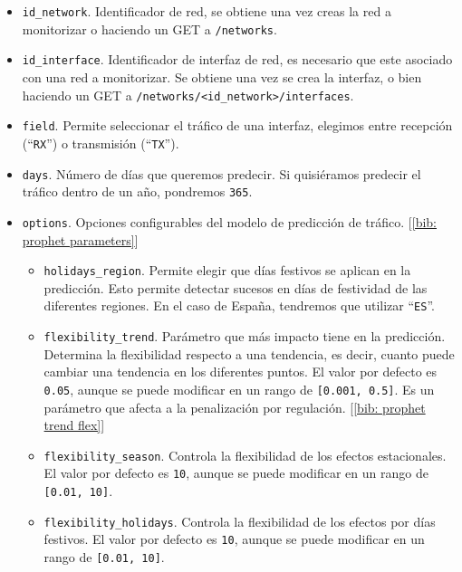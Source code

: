 \documentclass[a4paper, oneside, 12pt]{book}
\begin{document}
	\begin{itemize}
		\item \texttt{id\_network}. Identificador de red, se obtiene una vez creas la red a monitorizar o haciendo un GET a \texttt{/networks}.
		
		\item \texttt{id\_interface}. Identificador de interfaz de red, es necesario que este asociado con una red a monitorizar. Se obtiene una vez se crea la interfaz, o bien haciendo un GET a \texttt{/networks/<id\_network>/interfaces}.
		
		\item \texttt{field}. Permite seleccionar el tráfico de una interfaz, elegimos entre recepción (``\texttt{RX}'') o transmisión (``\texttt{TX}'').
		
		\item \texttt{days}. Número de días que queremos predecir. Si quisiéramos predecir el tráfico dentro de un año, pondremos \texttt{365}.
		
		\item \texttt{options}. Opciones configurables del modelo de predicción de tráfico. [\ref{bib: prophet parameters}]
		
		\begin{itemize}
			\item \texttt{holidays\_region}. Permite elegir que días festivos se aplican en la predicción. Esto permite detectar sucesos en días de festividad de las diferentes regiones. En el caso de España, tendremos que utilizar ``\texttt{ES}''.
			
			\item \texttt{flexibility\_trend}. Parámetro que más impacto tiene en la predicción. Determina la flexibilidad respecto a una tendencia, es decir, cuanto puede cambiar una tendencia en los diferentes puntos. El valor por defecto es \texttt{0.05}, aunque se puede modificar en un rango de \texttt{[0.001, 0.5]}. Es un parámetro que afecta a la penalización por regulación. [\ref{bib: prophet trend flex}]
			
			\item \texttt{flexibility\_season}. Controla la flexibilidad de los efectos estacionales. El valor por defecto es \texttt{10}, aunque se puede modificar en un rango de \texttt{[0.01, 10]}.
			
			\item \texttt{flexibility\_holidays}. Controla la flexibilidad de los efectos por días festivos. El valor por defecto es \texttt{10}, aunque se puede modificar en un rango de \texttt{[0.01, 10]}.
		\end{itemize}
	\end{itemize}
	
\end{document}
